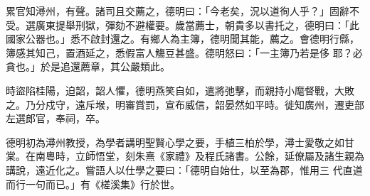 \begin{pinyinscope}
 累官知潯州，有聲。諸司且交薦之，德明曰：「今老矣，況以道徇人乎？」固辭不受。選廣東提舉刑獄，彈劾不避權要。歲當薦士，朝貴多以書托之，德明曰：「此國家公器也。」悉不啟封還之。有鄉人為主簿，德明聞其能，薦之。會德明行縣，簿感其知己，置酒延之，悉假富人觴豆甚盛。德明怒曰：「一主簿乃若是侈
 耶？必貪也。」於是追還薦章，其公嚴類此。



 時盜陷桂陽，迫韶，韶人懼，德明燕笑自如，遣將弛擊，而親持小麾督戰，大敗之。乃分戍守，遠斥堠，明審賞罰，宣布威信，韶晏然如平時。徙知廣州，遷吏部左選郎官，奉祠，卒。



 德明初為潯州教授，為學者講明聖賢心學之要，手植三柏於學，潯士愛敬之如甘棠。在南粵時，立師悟堂，刻朱熹《家禮》及程氏諸書。公餘，延僚屬及諸生親為講說，遠近化之。嘗語人以仕學之要曰：「德明自始仕，以至為郡，惟用三
 代直道而行一句而已。」有《槎溪集》行於世。



\end{pinyinscope}